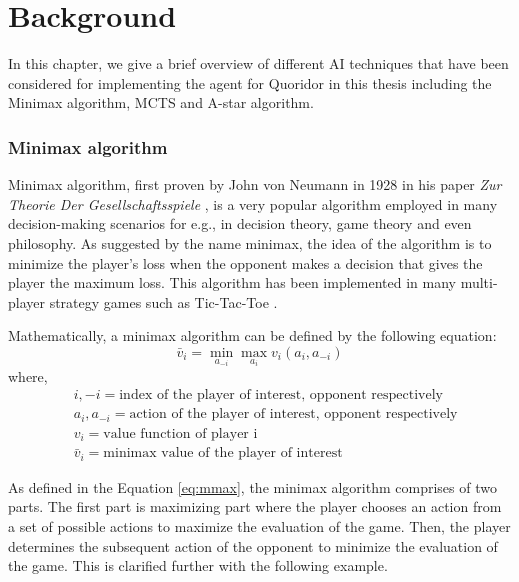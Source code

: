 \chapter{Background}
\label{background}

In this chapter, we give a brief overview of different \gls{AI} techniques that have been considered for implementing the agent for Quoridor in this thesis including the Minimax algorithm, \gls{MCTS} and A-star algorithm.

\subsection{Minimax algorithm} \label{sec:minimax}
Minimax algorithm, first proven by John von Neumann in 1928 in his paper \textit{Zur Theorie Der Gesellschaftsspiele} \citep{v1928theorie}, is a very popular algorithm employed in many decision-making scenarios for e.g., in decision theory, game theory and even philosophy. As suggested by the name minimax, the idea of the algorithm is to minimize the player's loss when the opponent makes a decision that gives the player the maximum loss. This algorithm has been implemented in many multi-player strategy games such as Tic-Tac-Toe \citep{savelli2008tic}. 


Mathematically, a minimax algorithm can be defined by the following equation:
\begin{equation}\label{eq:mmax}
    \bar{v}_i = \min_{a_{-i}} \max_{a_{i}} v_i (a_i, a_{-i})
\end{equation}
where,
\begin{subequations}
\begin{align}
    &i, -i = \text{index of the player of interest, opponent respectively} \\
    &a_i, a_{-i}= \text{action of the player of interest, opponent respectively} \\
    &v_i = \text{value function of player i} \\
    &\bar{v}_i = \text{minimax value of the player of interest}
\end{align}
\end{subequations}

As defined in the Equation \eqref{eq:mmax}, the minimax algorithm comprises of two parts. The first part is maximizing part where the player chooses an action from a set of possible actions to maximize the evaluation of the game. Then, the player determines the subsequent action of the opponent to minimize the evaluation of the game. This is clarified further with the following example.

